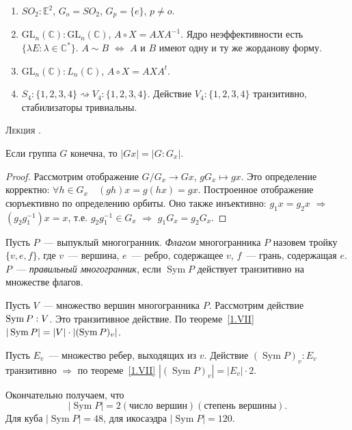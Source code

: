 \documentclass[a4paper]{article}
\newcounter{lec}
\renewcommand{\thelec}{\Roman{lec}}
\newcommand*{\lecture}[1]{\refstepcounter{lec}\vspace{20pt}
\begin{center}{\rmfamily\textsc{Лекция \thelec. \\ \textbf{#1}}}\vspace{5pt}
\end{center}}
\newcommand{\Sym}{\mathop{\mathrm{Sym}}\nolimits}
\newcommand*{\p}[1]{#1\nobreak\discretionary{}{\hbox{$\mathsurround=0pt #1$}}{}}
\begin{document}
\begin{ex}
\begin{enumerate}
  \item $SO_2:\mathbb{E}^2$, $G_o=SO_2$, $G_p=\{e\}$, $p\neq o$.
  \item $\mathrm{GL}_n(\mathbb{C}):\mathrm{GL}_n(\mathbb{C})$, $A\circ X=AXA^{-1}$.
  Ядро неэффективности есть $\{\lambda E: \lambda\in\mathbb{C}^*\}$.
  $A\sim B$ $\Leftrightarrow$ $A$ и $B$ имеют одну и ту же жорданову
  форму.
  \item $\mathrm{GL}_n(\mathbb{C}):L_n(\mathbb{C})$, $A\circ X=AXA^t$.
  \item $S_4:\{1,2,3,4\}\rightsquigarrow V_4:\{1,2,3,4\}$. Действие
  $V_4:\{1,2,3,4\}$ транзитивно, стабилизаторы тривиальны.
\end{enumerate}
\end{ex}
\lecture{}

\begin{theorem}
\label{1.VII}Если группа $G$ конечна, то $|Gx|=|G:G_x|$.
\end{theorem}

\begin{proof}
Рассмотрим отображение $G/G_x\to Gx$, $gG_x\mapsto gx$. Это
определение корректно: $\forall h\in G_x\quad (gh)x=g(hx)=gx$.
Построенное отображение сюръективно по определению орбиты. Оно также
инъективно: $g_1x=g_2x$ $\Rightarrow$ $(g_2g_1^{-1})x=x$, т.е.
$g_2g_1^{-1}\in G_x$ $\Rightarrow$ $g_1G_x=g_2G_x$.
\end{proof}

Пусть $P$~--- выпуклый многогранник. \emph{Флагом} многогранника $P$
назовем тройку $\{v,e,f\}$, где $v$~--- вершина, $e$~--- ребро,
содержащее $v$, $f$~--- грань, содержащая $e$. $P$~---
\emph{правильный многогранник}, если $\Sym P$ действует транзитивно
на множестве флагов.

Пусть $V$~--- множество вершин многогранника $P$. Рассмотрим
действие $\Sym P\p: V$. Это транзитивное действие. По
теореме~\ref{1.VII} $|\Sym P|\p=|V|\cdot|(\Sym P)_v|$.

Пусть $E_v$~--- множество ребер, выходящих из $v$. Действие $(\Sym
P)_v:E_v$ транзитивно $\Rightarrow$ по теореме~\ref{1.VII} $|(\Sym
P)_v|=|E_v|\cdot 2$.

Окончательно получаем, что $$|\Sym P|=2(\text{число
вершин})(\text{степень вершины}).$$ Для куба $|\Sym P|=48$, для
икосаэдра $|\Sym P|=120$.
\end{document}
